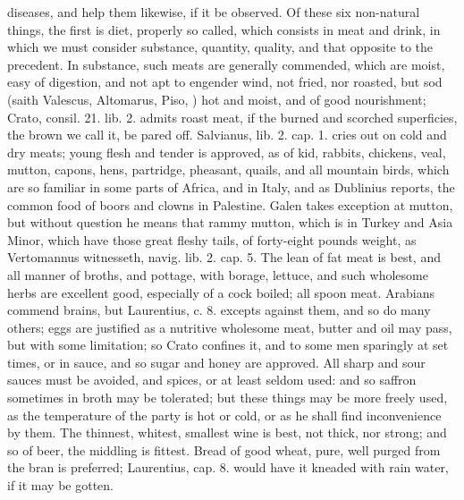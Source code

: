 {diseases, and help them likewise, if it be observed.
Of these six non-natural things, the first is diet, properly so called,
which consists in meat and drink, in which we must consider substance,
quantity, quality, and that opposite to the precedent. In substance,
such meats are generally commended, which are moist, easy of
digestion, and not apt to engender wind, not fried, nor roasted, but
sod (saith Valescus, Altomarus, Piso, \etc{}) hot and moist, and of good
nourishment; Crato, consil. 21. lib. 2. admits roast meat, if the
burned and scorched superficies, the brown we call it, be pared off.
Salvianus, lib. 2. cap. 1. cries out on cold and dry meats; young
flesh and tender is approved, as of kid, rabbits, chickens, veal,
mutton, capons, hens, partridge, pheasant, quails, and all mountain
birds, which are so familiar in some parts of Africa, and in Italy, and
as Dublinius reports, the common food of boors and clowns in
Palestine. Galen takes exception at mutton, but without question he
means that rammy mutton, which is in Turkey and Asia Minor, which have
those great fleshy tails, of forty-eight pounds weight, as Vertomannus
witnesseth, navig. lib. 2. cap. 5. The lean of fat meat is best, and
all manner of broths, and pottage, with borage, lettuce, and such
wholesome herbs are excellent good, especially of a cock boiled; all
spoon meat. Arabians commend brains, but Laurentius, c. 8.
excepts against them, and so do many others; eggs are justified
as a nutritive wholesome meat, butter and oil may pass, but with some
limitation; so Crato confines it, and to some men sparingly at
set times, or in sauce, and so sugar and honey are approved. All
sharp and sour sauces must be avoided, and spices, or at least seldom
used: and so saffron sometimes in broth may be tolerated; but these
things may be more freely used, as the temperature of the party is hot
or cold, or as he shall find inconvenience by them. The thinnest,
whitest, smallest wine is best, not thick, nor strong; and so of beer,
the middling is fittest. Bread of good wheat, pure, well purged from
the bran is preferred; Laurentius, cap. 8. would have it kneaded with
rain water, if it may be gotten.
}
